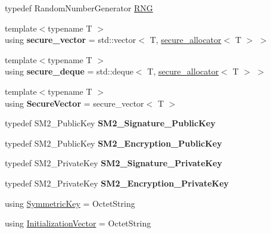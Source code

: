 \begin{DoxyCompactItemize}
\item 
typedef Random\+Number\+Generator \hyperlink{namespace_botan_a45fbc8259840830135e2cf779839ddfa}{R\+NG}
\item 
\mbox{\label{namespace_botan_ae90f7fcf7b0aa3dd88a59f186f6e6307}} 
{\footnotesize template$<$typename T $>$ }\\using {\bfseries secure\+\_\+vector} = std\+::vector$<$ T, \hyperlink{class_botan_1_1secure__allocator}{secure\+\_\+allocator}$<$ T $>$ $>$
\item 
\mbox{\label{namespace_botan_a15c6c2c9f6366dcefa326d40c7d0f281}} 
{\footnotesize template$<$typename T $>$ }\\using {\bfseries secure\+\_\+deque} = std\+::deque$<$ T, \hyperlink{class_botan_1_1secure__allocator}{secure\+\_\+allocator}$<$ T $>$ $>$
\item 
\mbox{\label{namespace_botan_aee2f8a23186bf117dde5a6bf7f59fad9}} 
{\footnotesize template$<$typename T $>$ }\\using {\bfseries Secure\+Vector} = secure\+\_\+vector$<$ T $>$
\item 
\mbox{\label{namespace_botan_a3e465e0eda1d2e69044658b6827ad417}} 
typedef S\+M2\+\_\+\+Public\+Key {\bfseries S\+M2\+\_\+\+Signature\+\_\+\+Public\+Key}
\item 
\mbox{\label{namespace_botan_a1d6a89815f08e0339626b3dc0f2e3bc1}} 
typedef S\+M2\+\_\+\+Public\+Key {\bfseries S\+M2\+\_\+\+Encryption\+\_\+\+Public\+Key}
\item 
\mbox{\label{namespace_botan_a352d0f7e1c0aa6e6363adb6b2371e15f}} 
typedef S\+M2\+\_\+\+Private\+Key {\bfseries S\+M2\+\_\+\+Signature\+\_\+\+Private\+Key}
\item 
\mbox{\label{namespace_botan_aa37405b19030e321df4154a1510ed88d}} 
typedef S\+M2\+\_\+\+Private\+Key {\bfseries S\+M2\+\_\+\+Encryption\+\_\+\+Private\+Key}
\item 
using \hyperlink{namespace_botan_a89cf6c3513428f524454d01830221a88}{Symmetric\+Key} = Octet\+String
\item 
using \hyperlink{namespace_botan_a2fbf5195ffe701adcabb1f8c41bfc557}{Initialization\+Vector} = Octet\+String

\end{DoxyCompactItemize}
